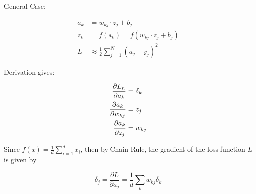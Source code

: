 \documentclass[10pt]{article}
\begin{document}
General Case:

\begin{align*}
  a_k &= w_{kj}\cdot z_j + b_j\\
  z_k &= f(a_k) = f(w_{kj}\cdot z_j + b_j)\\
  L &\approx \frac{1}{2}\sum_{j=1}^{N}(a_j-y_j)^2
\end{align*}

Derivation gives:

\begin{align*}
  \pdv{L_n}{a_k} &= \delta_k\\
  \pdv{a_k}{w_{kj}} &= z_{j}\\
  \pdv{a_k}{z_j} &= w_{kj}
\end{align*}

Since $f(x)=\frac{1}{d} \sum_{i=1}^{d} x_{i}$, then by Chain Rule, the gradient of the loss function $L$ is given by



$$\delta_{j}=\frac{\partial L}{\partial a_{j}}=\frac{1}{d}\sum_{k} w_{kj}\delta_k$$



\end{document}
